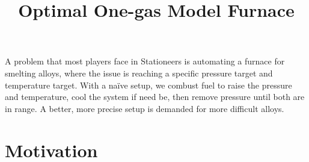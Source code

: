 \documentclass{article}
\begin{document}
\title{Optimal One-gas Model Furnace}
\maketitle

A problem that most players face in Stationeers is automating a furnace
for smelting alloys, where the issue is reaching a specific pressure target
and temperature target. With a naïve setup, we combust fuel to raise the
pressure and temperature, cool the system if need be, then remove pressure
until both are in range. A better, more precise setup is demanded for
more difficult alloys.

\section{Motivation}
\end{document}
